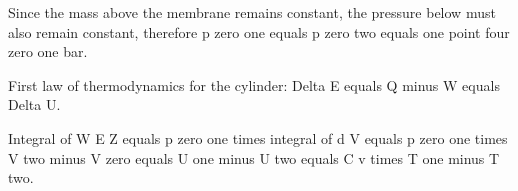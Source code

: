 Since the mass above the membrane remains constant, the pressure below must also remain constant, therefore p zero one equals p zero two equals one point four zero one bar.

First law of thermodynamics for the cylinder:
Delta E equals Q minus W equals Delta U.

Integral of W E Z equals p zero one times integral of d V equals p zero one times V two minus V zero equals U one minus U two equals C v times T one minus T two.